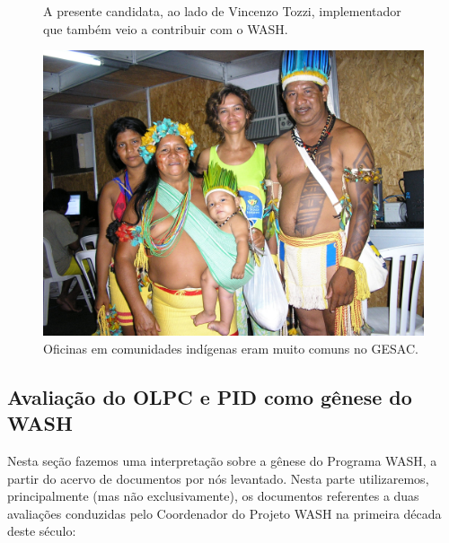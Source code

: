 \documentclass[
12pt,		%
openright,	%
twoside,  %
a4paper,			%
chapter=TITLE,		%
english,			%
french,				%
spanish,			%
brazil				%
]{USPSC-classe/USPSC}
\begin{document}
\begin{figure}[max size={\textwidth}{\textheight}]
\begin{minipage}[b]{0.4\linewidth}
                \caption{A presente candidata, ao lado de Vincenzo Tozzi, implementador que tamb\'em veio a contribuir com o WASH.}
                \label{4459669909728990ef00df4bdb6a369f3449704e}
\end{minipage}
\hspace{0.5cm}
\begin{minipage}[b]{0.4\linewidth}
        \centering
                \includegraphics[width=1.0\linewidth]{../../imagens/povo.JPG}
                \caption{Oficinas em comunidades ind\'{i}genas eram muito comuns no GESAC.}
                \label{50c13a4f82feece9e41db915d8e5bc4c5d5094dd}
\end{minipage}%
\hspace{0.5cm}
\end{figure}



\subsection[Avalia\c{c}\~ao do OLPC e PID como g\^enese do WASH]{Avalia\c{c}\~ao do OLPC e PID como g\^enese do WASH}\label{Avalia\c{c}\~ao do OLPC e PID como g\^enese do WASH}
Nesta se\c{c}\~ao fazemos uma interpreta\c{c}\~ao sobre a g\^enese do Programa WASH, a partir do acervo de documentos por n\'os levantado. Nesta parte utilizaremos, principalmente (mas n\~ao exclusivamente), os documentos referentes a duas avalia\c{c}\~oes conduzidas pelo Coordenador do Projeto WASH na primeira d\'ecada deste s\'eculo:
\end{document}
